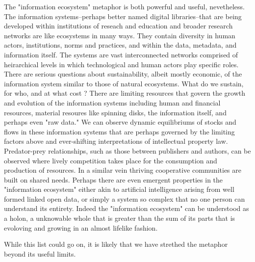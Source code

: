 The "information ecosystem" metaphor is both powerful and useful, nevetheless. The information systems--perhaps better named digital libraries--that are being developed within institutions of reseach and education and broader research networks are like ecosystems in many ways. They contain diversity in human actors, institutions, norms and practices, and within the data, metadata, and information itself. The systems are vast interconnected networks comprised of heirarchical levels in which technological and human actors play specific roles. There are serious questions about sustainability, albeit mostly economic, of the information system similar to those of natural ecosystems. What do we sustain, for who, and at what cost \cite[cf.][especially ch 3(?)]{liverman_2004, kitchin_2014}? There are limiting resources that govern the growth and evolution of the information systems including human and financial resources, material resoures like spinning disks, the information itself, and perhaps even "raw data." We can observe dynamic equilibriums of stocks and flows in these information systems that are perhaps governed by the limiting factors above and ever-shifting interpretations of intellectual property law. Predator-prey relationships, such as those between publishers and authors, can be observed where lively competition takes place for the consumption and production of resources. In a similar vein thriving cooperative communities are built on shared needs. Perhaps there are even emergent properties in the "information ecosystem" either akin to artificial intelligence arising from well formed linked open data, or simply a system so complex that no one person can understand its entirety. Indeed the "information ecosystem" can be understood as a holon, a unknowable whole that is greater than the sum of its parts that is evoloving and growing in an almost lifelike fashion. 

While this list could go on, it is likely that we have strethed the metaphor beyond its useful limits.

